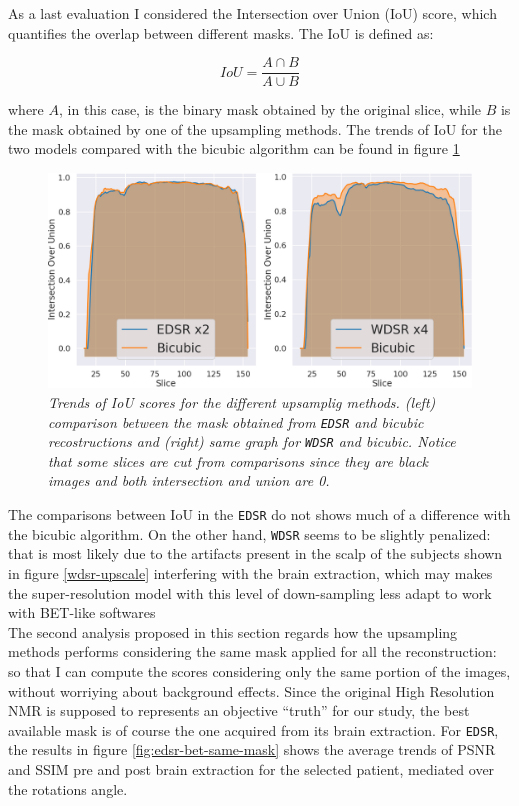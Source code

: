 \documentclass[12pt,a4paper]{report}
\begin{document}
As a last evaluation I considered the Intersection over Union (IoU) score, which quantifies the overlap between different masks. 
The IoU is defined as: 

\begin{equation}
 IoU = \frac{A \cap B}{A \cup B}
\end{equation}

where $A$, in this case, is the binary mask obtained by the original slice, while $B$ is the mask obtained by one of the upsampling methods.
The trends of IoU for the two models compared with the bicubic algorithm can be found in figure \ref{fig:iou}

\begin{figure}[H]
 \centering
 \includegraphics[scale=0.35]{./images/iou_scores.png}
 \caption{\it Trends of IoU scores for the different upsamplig methods. (left) comparison between the mask obtained from {\tt EDSR} and bicubic recostructions and (right) same graph for {\tt WDSR} and bicubic. 
 Notice that some slices are cut from comparisons since they are black images and both intersection and union are 0.}
 \label{fig:iou}
\end{figure}

The comparisons between IoU in the {\tt EDSR} do not shows much of a difference with the bicubic algorithm. On the other hand, {\tt WDSR} seems to be slightly penalized: that is most likely due to the artifacts present in the scalp of the subjects shown
in figure \ref{wdsr-upscale} interfering with the brain extraction, which may makes the super-resolution model with this level of down-sampling less adapt to work with BET-like softwares
\\
The second analysis proposed in this section regards how the upsampling methods performs considering the same mask applied for all the reconstruction: so that I can compute the scores considering only the same portion of the images, without worriying about background effects. 
Since the original High Resolution NMR is supposed to represents an objective ``truth'' for our study, the best available mask is of course the one acquired from its brain extraction.
For {\tt EDSR}, the results in figure \ref{fig:edsr-bet-same-mask} shows the average trends of PSNR and SSIM pre and post brain extraction for the selected patient, mediated over the rotations angle.
\end{document}
